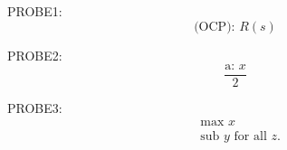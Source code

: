\documentclass{article}
\begin{document}
PROBE1: \[ \text{(OCP): }R(s) \]

PROBE2: \[ \frac{\text{a: }x}{2} \]

PROBE3: \[ \begin{split}&\text{max $x$}\\&\text{sub $y$ for
all $z$}.\end{split} \]
\end{document}
